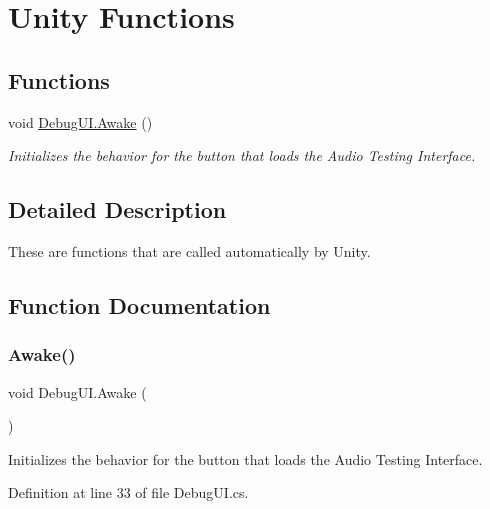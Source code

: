 \hypertarget{group___deb_u_i_unity}{}\section{Unity Functions}
\label{group___deb_u_i_unity}
\subsection*{Functions}
\begin{DoxyCompactItemize}
\item 
void \hyperlink{group___deb_u_i_unity_ga1369ce8825b055ee93722b2626a06d1e}{Debug\+U\+I.\+Awake} ()
\begin{DoxyCompactList}\small\item\em Initializes the behavior for the button that loads the Audio Testing Interface. \end{DoxyCompactList}\end{DoxyCompactItemize}


\subsection{Detailed Description}
These are functions that are called automatically by Unity. 

\subsection{Function Documentation}
\mbox{\label{group___deb_u_i_unity_ga1369ce8825b055ee93722b2626a06d1e}} 
\subsubsection{\texorpdfstring{Awake()}{Awake()}}
{\footnotesize\ttfamily void Debug\+U\+I.\+Awake (\begin{DoxyParamCaption}{ }\end{DoxyParamCaption})\hspace{0.3cm}{\ttfamily [private]}}



Initializes the behavior for the button that loads the Audio Testing Interface. 



Definition at line 33 of file Debug\+U\+I.\+cs.



